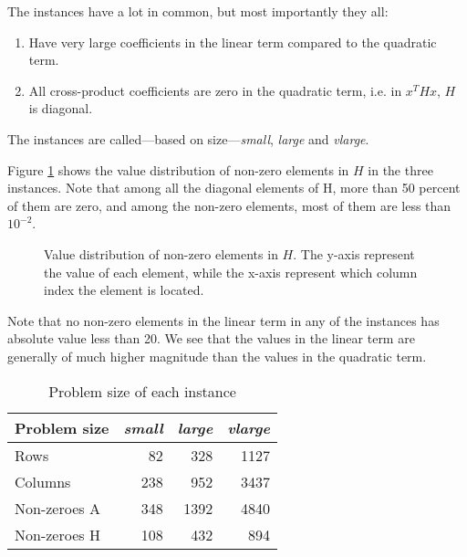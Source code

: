 The instances have a lot in common, but most importantly they all:
\begin{enumerate}
\item Have very large coefficients in the linear term compared to the
quadratic term.
\item All cross-product coefficients are zero in the quadratic term, i.e. in
$x^T H x$, $H$ is diagonal.
\end{enumerate}

The instances are called---based on size---\textit{small}, \textit{large}
and \textit{vlarge}.

Figure \ref{fig:histH} shows the value distribution of non-zero elements in $H$
in the three instances. Note that among all the diagonal elements of H, more
than 50 percent of them are zero, and among the non-zero elements, most of them
are less than $10^{-2}$.
\begin{figure}[ht!]
\begin{center}

\end{center}
\caption{Value distribution of non-zero elements in $H$. The y-axis represent
the value of each element, while the x-axis represent which column index the
element is located.}
\label{fig:histH}
\end{figure}
Note that no non-zero elements in the linear term in any of the instances
has absolute value less than 20. We see that the values in the linear term
are generally of much higher magnitude than the values in the quadratic term.

\begin{table}[ht!]
    \centering
    \caption{Problem size of each instance}
    \begin{tabular}{lrrr}
    Problem size & \textit{small} & \textit{large} & \textit{vlarge} \\\hline
    Rows         & 82             & 328            & 1127 \\
    Columns      & 238            & 952            & 3437 \\
    Non-zeroes A & 348            & 1392           & 4840 \\
    Non-zeroes H & 108            & 432            & 894 \\
    \end{tabular}
    \label{table:sizes}
\end{table}

